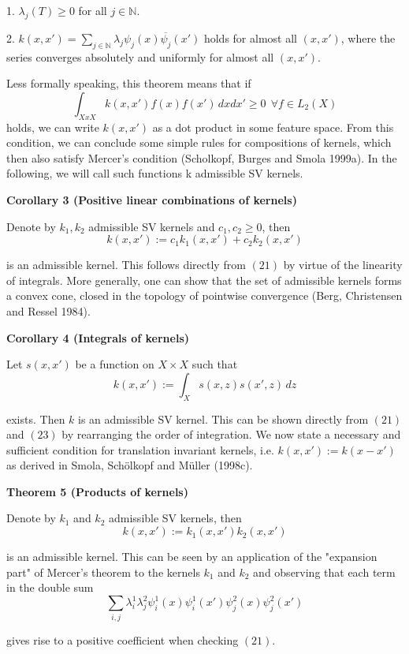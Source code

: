 \documentclass[fleqn,10pt]{olplainarticle}
\begin{document}
1. \(\lambda_j(T) \geq 0\) for all \(j \in \mathbb{N}\).

2. \(k(x, x') = \sum_{j \in \mathbb{N}} \lambda_j \psi_j(x) \overline{\psi_j}(x')\) holds for almost all \((x, x')\), where the series converges absolutely and uniformly for almost all \((x, x')\).

Less formally speaking, this theorem means that if
\[
\int_{XxX} k(x, x') f(x) f(x') \, dx dx' \geq 0 \ \ \forall f \in L_2(X) 
\]
holds, we can write \(k(x, x')\) as a dot product in some feature space. From this condition, we can conclude some simple rules for compositions of kernels, which then also satisfy Mercer's condition (Scholkopf, Burges and Smola 1999a). In the following, we will call such functions k admissible SV kernels.

\textbf{Corollary 3 (Positive linear combinations of kernels)}

Denote by \(k_1, k_2\) admissible SV kernels and \(c_1, c_2 \geq 0\), then
\[
k(x, x') := c_1k_1(x, x') + c_2k_2(x, x')
\]

is an admissible kernel. This follows directly from \((21)\) by virtue of the linearity of integrals. More generally, one can show that the set of admissible kernels forms a convex cone, closed in the topology of pointwise convergence (Berg, Christensen and Ressel 1984).

\textbf{Corollary 4 (Integrals of kernels)}

Let \(s(x, x')\) be a function on \(X \times X\) such that
\[
k(x, x') := \int_X s(x, z)s(x', z) \, dz
\]

exists. Then \(k\) is an admissible SV kernel. This can be shown directly from \((21)\) and \((23)\) by rearranging the order of integration. We now state a necessary and sufficient condition for translation invariant kernels, i.e. \(k(x, x') := k(x - x')\) as derived in Smola, Sch\"olkopf and M\"uller (1998c).

\textbf{Theorem 5 (Products of kernels)}

Denote by \(k_1\) and \(k_2\) admissible SV kernels, then
\[
k(x, x') := k_1(x, x')k_2(x, x')
\]

is an admissible kernel. This can be seen by an application of the "expansion part" of Mercer's theorem to the kernels \(k_1\) and \(k_2\) and observing that each term in the double sum
\[
\sum_{i, j} \lambda_{i}^1 \lambda_{j}^2 \psi_{i}^1(x) \psi_{i}^1(x') \psi_{j}^2(x) \psi_{j}^2(x')
\]

gives rise to a positive coefficient when checking \((21)\).
\end{document}
